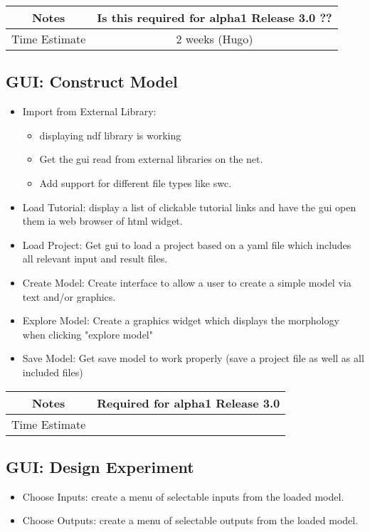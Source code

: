 \documentclass[12pt]{article}
\begin{document}
{
  \vspace{5mm}
  \centering
  \begin{tabular}{|c|c|}
    \hline
    Notes
    & Is this required for alpha1 Release 3.0 ?? \\
    \hline
    Time Estimate
    & 2 weeks (Hugo) \\
    \hline
  \end{tabular}
}


\subsection{GUI: Construct Model}

\begin{itemize}
\item Import from External Library:
  \begin{itemize}
  \item displaying ndf library is working
  \item Get the gui read from external libraries on the net.
  \item Add support for different file types like swc.
  \end{itemize}
\item Load Tutorial: display a list of clickable tutorial links and
  have the gui open them ia web browser of html widget.
\item Load Project: Get gui to load a project based on a yaml file
  which includes all relevant input and result files.
\item Create Model: Create interface to allow a user to create a
  simple model via text and/or graphics.
\item Explore Model: Create a graphics widget which displays the
  morphology when clicking "explore model"
\item Save Model: Get save model to work properly (save a project file
  as well as all included files)
\end{itemize}

{
  \vspace{5mm}
  \centering
  \begin{tabular}{|c|c|}
    \hline
    Notes
    & Required for alpha1 Release 3.0 \\
    \hline
    Time Estimate
    & \\
    \hline
  \end{tabular}
}


\subsection{GUI: Design Experiment}
\begin{itemize}
\item Choose Inputs: create a menu of selectable inputs from the loaded model.
\item Choose Outputs: create a menu of selectable outputs from the loaded model.
\end{itemize}
\end{document}
